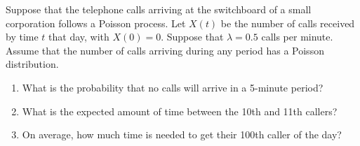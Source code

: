 \item Suppose that the telephone calls 
arriving at the switchboard of a small corporation follows a Poisson process.
Let $X(t)$ be the number of calls received by time $t$ that day, with $X(0)=0$.
Suppose that $\lambda=0.5$ calls per minute.
Assume that the number of calls arriving during any period has a Poisson distribution.

\begin{enumerate}
\item What is the probability that no calls will arrive in a 5-minute period?
\item What is the expected amount of time between the 10th and 11th callers?
\item On average, how much time is needed to get their 100th caller of the day?
\end{enumerate}

